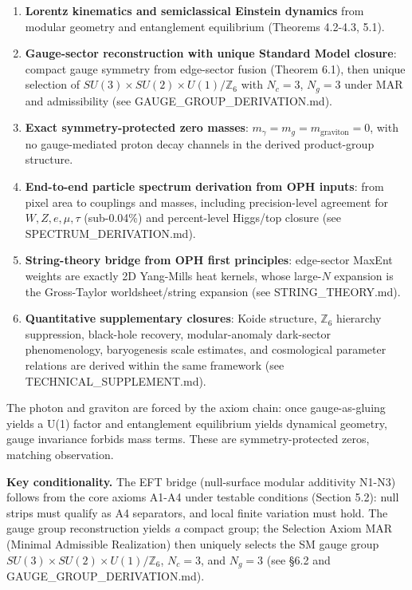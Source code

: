 \begin{enumerate}
\def\labelenumi{\arabic{enumi}.}
\tightlist
\item
  \textbf{Lorentz kinematics and semiclassical Einstein dynamics} from modular geometry and entanglement equilibrium (Theorems 4.2-4.3, 5.1).
\item
  \textbf{Gauge-sector reconstruction with unique Standard Model closure}: compact gauge symmetry from edge-sector fusion (Theorem 6.1), then unique selection of \(SU(3)\times SU(2)\times U(1)/\mathbb{Z}_6\) with \(N_c=3\), \(N_g=3\) under MAR and admissibility (see GAUGE\_GROUP\_DERIVATION.md).
\item
  \textbf{Exact symmetry-protected zero masses}: \(m_\gamma = m_g = m_{\text{graviton}} = 0\), with no gauge-mediated proton decay channels in the derived product-group structure.
\item
  \textbf{End-to-end particle spectrum derivation from OPH inputs}: from pixel area to couplings and masses, including precision-level agreement for \(W, Z, e, \mu, \tau\) (sub-0.04\%) and percent-level Higgs/top closure (see SPECTRUM\_DERIVATION.md).
\item
  \textbf{String-theory bridge from OPH first principles}: edge-sector MaxEnt weights are exactly 2D Yang-Mills heat kernels, whose large-\(N\) expansion is the Gross-Taylor worldsheet/string expansion (see STRING\_THEORY.md).
\item
  \textbf{Quantitative supplementary closures}: Koide structure, \(\mathbb{Z}_6\) hierarchy suppression, black-hole recovery, modular-anomaly dark-sector phenomenology, baryogenesis scale estimates, and cosmological parameter relations are derived within the same framework (see TECHNICAL\_SUPPLEMENT.md).
\end{enumerate}

The photon and graviton are forced by the axiom chain: once gauge-as-gluing yields a U(1) factor and entanglement equilibrium yields dynamical geometry, gauge invariance forbids mass terms. These are symmetry-protected zeros, matching observation.

\textbf{Key conditionality.} The EFT bridge (null-surface modular additivity N1-N3) follows from the core axioms A1-A4 under testable conditions (Section 5.2): null strips must qualify as A4 separators, and local finite variation must hold. The gauge group reconstruction yields \emph{a} compact group; the Selection Axiom MAR (Minimal Admissible Realization) then uniquely selects the SM gauge group \(SU(3) \times SU(2) \times U(1)/\mathbb{Z}_6\), \(N_c = 3\), and \(N_g = 3\) (see §6.2 and GAUGE\_GROUP\_DERIVATION.md).

